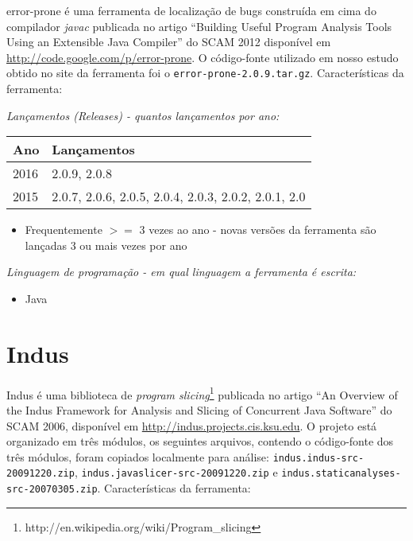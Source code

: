 error-prone é uma ferramenta de localização de bugs construída em cima do
compilador {\it javac} publicada no artigo ``Building Useful Program Analysis
Tools Using an Extensible Java Compiler'' do SCAM 2012 disponível em
\url{http://code.google.com/p/error-prone}. O código-fonte utilizado em nosso
estudo obtido no site da ferramenta foi o \texttt{error-prone-2.0.9.tar.gz}.
Características da ferramenta:

\begin{description}

  \item {\it Lançamentos ({\it Releases}) - quantos lançamentos por ano:}
    \begin{table}[h!]
      \centering
      \begin{tabular}{| l | l |}
        \hline
        Ano  & Lançamentos                                          \\
        \hline
        2016 & 2.0.9, 2.0.8                                         \\
        2015 & 2.0.7, 2.0.6, 2.0.5, 2.0.4, 2.0.3, 2.0.2, 2.0.1, 2.0 \\
        \hline
      \end{tabular}
    \end{table}
    \begin{itemize}
      \item Frequentemente $>=$ 3 vezes ao ano - novas versões da ferramenta são lançadas 3 ou mais vezes por ano
    \end{itemize}

  \item {\it Linguagem de programação - em qual linguagem a ferramenta é escrita:}
    \begin{itemize}
      \item Java
    \end{itemize}

\end{description}

\section{Indus}

Indus é uma biblioteca de {\it program
slicing}\footnote{http://en.wikipedia.org/wiki/Program\_slicing} publicada no
artigo ``An Overview of the Indus Framework for Analysis and Slicing of
Concurrent Java Software'' do SCAM 2006, disponível em
\url{http://indus.projects.cis.ksu.edu}.  O projeto está organizado em três
módulos, os seguintes arquivos, contendo o código-fonte dos três módulos,
foram copiados localmente para análise:
\texttt{indus.indus-src-20091220.zip},
\texttt{indus.javaslicer-src-20091220.zip} e
\texttt{indus.staticanalyses-src-20070305.zip}. Características da ferramenta:

